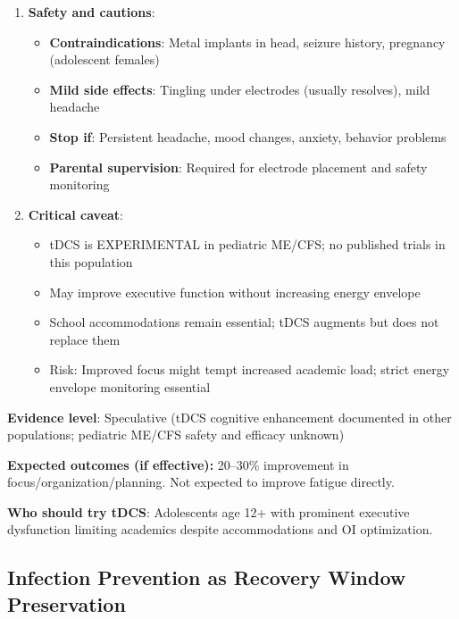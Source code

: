 \begin{recommendation}
\begin{enumerate}
    \item \textbf{Safety and cautions}:
    \begin{itemize}
        \item \textbf{Contraindications}: Metal implants in head, seizure history, pregnancy (adolescent females)
        \item \textbf{Mild side effects}: Tingling under electrodes (usually resolves), mild headache
        \item \textbf{Stop if}: Persistent headache, mood changes, anxiety, behavior problems
        \item \textbf{Parental supervision}: Required for electrode placement and safety monitoring
    \end{itemize}

    \item \textbf{Critical caveat}:
    \begin{itemize}
        \item tDCS is EXPERIMENTAL in pediatric ME/CFS; no published trials in this population
        \item May improve executive function without increasing energy envelope
        \item School accommodations remain essential; tDCS augments but does not replace them
        \item Risk: Improved focus might tempt increased academic load; strict energy envelope monitoring essential
    \end{itemize}
\end{enumerate}

\textbf{Evidence level}: Speculative (tDCS cognitive enhancement documented in other populations; pediatric ME/CFS safety and efficacy unknown)

\textbf{Expected outcomes (if effective):} 20--30\% improvement in focus/organization/planning. Not expected to improve fatigue directly.

\textbf{Who should try tDCS}: Adolescents age 12+ with prominent executive dysfunction limiting academics despite accommodations and OI optimization.

\end{recommendation}

\subsection{Infection Prevention as Recovery Window Preservation}
\label{subsec:ped-infection-prevention}

